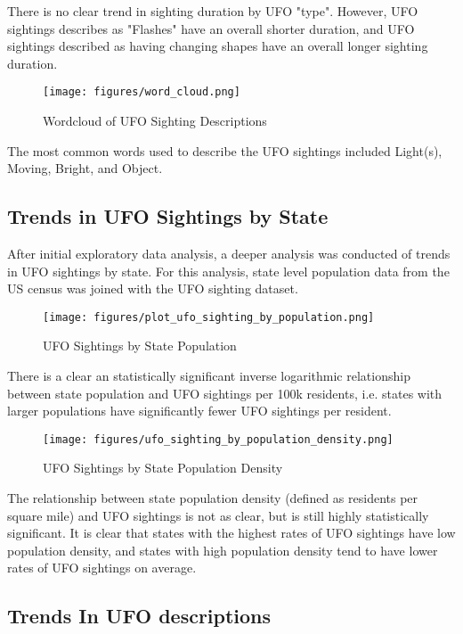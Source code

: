 \documentclass{article}
\begin{document}
\par There is no clear trend in sighting duration by UFO "type". However, UFO sightings describes as "Flashes" have an overall shorter duration, and UFO sightings described as having changing shapes have an overall longer sighting duration. 

\begin{figure}[!ht]
  \centering
  \texttt{[image: figures/word\_cloud.png]}
  \caption{Wordcloud of UFO Sighting Descriptions}
  \label{fig:wordcloud}
\end{figure}
\par The most common words used to describe the UFO sightings included Light(s), Moving, Bright, and Object. 

\subsection{Trends in UFO Sightings by State}
\par After initial exploratory data analysis, a deeper analysis was conducted of trends in UFO sightings by state. For this analysis, state level population data from the US census was joined with the UFO sighting dataset.

\begin{figure}[!ht]
  \centering
  \texttt{[image: figures/plot\_ufo\_sighting\_by\_population.png]}
  \caption{UFO Sightings by State Population}
  \label{fig:sightings_by_pop}
\end{figure}

\par There is a clear an statistically significant inverse logarithmic relationship between state population and UFO sightings per 100k residents, i.e. states with larger populations have significantly fewer UFO sightings per resident. 

\begin{figure}[!hb]
  \centering
  \texttt{[image: figures/ufo\_sighting\_by\_population\_density.png]}
  \caption{UFO Sightings by State Population Density}
  \label{fig:sightings_by_pop_density}
\end{figure}

\par The relationship between state population density (defined as residents per square mile) and UFO sightings is not as clear, but is still highly statistically significant. It is clear that states with the highest rates of UFO sightings have low population density, and states with high population density tend to have lower rates of UFO sightings on average.

\subsection{Trends In UFO descriptions}
\end{document}
